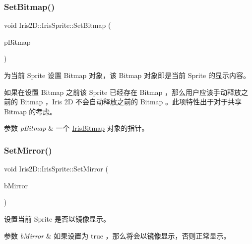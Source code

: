 \subsubsection{\texorpdfstring{Set\+Bitmap()}{SetBitmap()}}
{\footnotesize\ttfamily void Iris2\+D\+::\+Iris\+Sprite\+::\+Set\+Bitmap (\begin{DoxyParamCaption}\item[{\hyperlink{class_iris2_d_1_1_iris_bitmap}{Iris\+Bitmap} $\ast$}]{p\+Bitmap }\end{DoxyParamCaption})}



为当前 Sprite 设置 Bitmap 对象，该 Bitmap 对象即是当前 Sprite 的显示内容。 

如果在设置 Bitmap 之前该 Sprite 已经存在 Bitmap ，那么用户应该手动释放之前的 Bitmap ，\+Iris 2D 不会自动释放之前的 Bitmap 。此项特性出于对于共享 Bitmap 的考虑。 
\begin{DoxyParams}{参数}
{\em p\+Bitmap} & 一个 \hyperlink{class_iris2_d_1_1_iris_bitmap}{Iris\+Bitmap} 对象的指针。 \\
\hline
\end{DoxyParams}
\mbox{\label{class_iris2_d_1_1_iris_sprite_a3ce55ee044b8345e93f8dfd45f23c72f}} 
\subsubsection{\texorpdfstring{Set\+Mirror()}{SetMirror()}}
{\footnotesize\ttfamily void Iris2\+D\+::\+Iris\+Sprite\+::\+Set\+Mirror (\begin{DoxyParamCaption}\item[{bool}]{b\+Mirror }\end{DoxyParamCaption})}



设置当前 Sprite 是否以镜像显示。 


\begin{DoxyParams}{参数}
{\em b\+Mirror} & 如果设置为 true ，那么将会以镜像显示，否则正常显示。 \\
\hline
\end{DoxyParams}
\mbox{\label{class_iris2_d_1_1_iris_sprite_a8f32660ac464af824864c2af8c883039}} 
